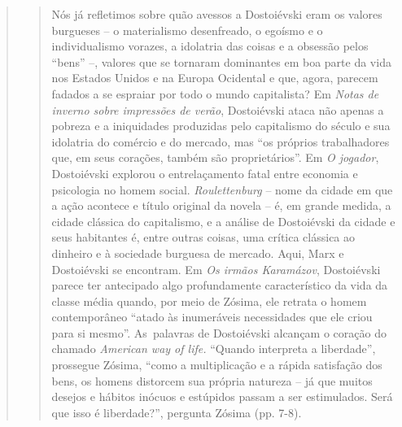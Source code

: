 {\begin{quote}
\begin{quote}
Nós já refletimos sobre quão avessos a Dostoiévski eram os valores
burgueses -- o materialismo desenfreado, o egoísmo e o individualismo
vorazes, a idolatria das coisas e a obsessão pelos ``bens'' --, valores
que se tornaram dominantes em boa parte da vida nos Estados Unidos e na
Europa Ocidental e que, agora, parecem fadados a se espraiar por todo o
mundo capitalista? Em \emph{Notas de inverno sobre impressões de verão},
Dostoiévski ataca não apenas a pobreza e a iniquidades produzidas pelo
capitalismo do século  e sua idolatria do comércio e do mercado, mas
``os próprios trabalhadores que, em seus corações, também são
proprietários''. Em \emph{O jogador}, Dostoiévski explorou o
entrelaçamento fatal entre economia e psicologia no homem social.
\emph{Roulettenburg} -- nome da cidade em que a ação acontece e título
original da novela -- é, em grande medida, a cidade clássica do
capitalismo, e a análise de Dostoiévski da cidade e seus habitantes é,
entre outras coisas, uma crítica clássica ao dinheiro e à sociedade
burguesa de mercado. Aqui, Marx e Dostoiévski se encontram. Em \emph{Os
irmãos Karamázov}, Dostoiévski parece ter antecipado algo profundamente
característico da vida da classe média quando, por meio de Zósima, ele
retrata o homem contemporâneo ``atado às inumeráveis necessidades que
ele criou para si mesmo''. As~palavras de Dostoiévski alcançam o coração
do chamado \emph{American way of life.} ``Quando interpreta a
liberdade'', prossegue Zósima, ``como a multiplicação e a rápida
satisfação dos bens, os homens distorcem sua própria natureza -- já que
muitos desejos e hábitos inócuos e estúpidos passam a ser estimulados.
Será que isso é liberdade?'', pergunta Zósima (pp. 7-8).
\end{quote}


\end{quote}}
